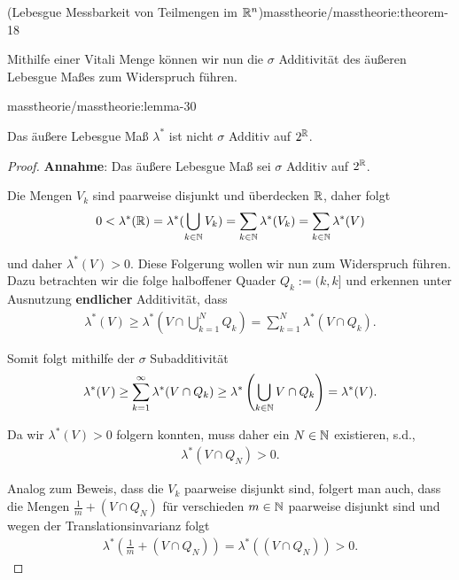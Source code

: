 \begin{theorem}{(Lebesgue Messbarkeit von Teilmengen im \protect\(\mathbb{R}^n\protect\))}{masstheorie/masstheorie:theorem-18}
\par
Mithilfe einer Vitali Menge können wir nun die \(\sigma\) Additivität des äußeren Lebesgue Maßes zum Widerspruch führen.
\begin{lemma}{}{masstheorie/masstheorie:lemma-30}



\par
Das äußere Lebesgue Maß \(\lambda^\ast\) ist nicht \(\sigma\) Additiv auf \(2^{\mathbb{R}}\).
\end{lemma}

\begin{proof}
 \textbf{Annahme}: Das äußere Lebesgue Maß sei \(\sigma\) Additiv auf \(2^{\mathbb{R}}\).

\par
Die Mengen \(V_k\) sind paarweise disjunkt und überdecken \(\mathbb{R}\), daher folgt
\begin{align*}
0<\lambda^\ast(\mathbb{R}) = \lambda^\ast(\bigcup_{k\in\mathbb{N}} V_k) = \sum_{k\in\mathbb{N}} \lambda^\ast(V_k) = \sum_{k\in\mathbb{N}} \lambda^\ast(V)
\end{align*}
\par
und daher \(\lambda^\ast(V)>0\). Diese Folgerung wollen wir nun zum Widerspruch führen. Dazu betrachten wir die folge halboffener Quader \(Q_k:=(k,k]\) und erkennen unter Ausnutzung \textbf{endlicher} Additivität, dass
\begin{align*}
\lambda^\ast(V) \geq \lambda^\ast\left(V \cap \bigcup_{k=1}^N Q_k\right) = 
\sum_{k=1}^N \lambda^\ast(V\cap Q_k).
\end{align*}
\par
Somit folgt mithilfe der \(\sigma\) Subadditivität
\begin{align*}
\lambda^\ast(V) \geq \sum_{k=1}^\infty \lambda^\ast(V\cap Q_k) \geq
\lambda^\ast\left(\bigcup_{k\in\mathbb{N}} V\cap Q_k\right) = \lambda^\ast(V).
\end{align*}
\par
Da wir \(\lambda^\ast(V)>0\) folgern konnten, muss daher ein \(N\in\mathbb{N}\) existieren, s.d.,
\begin{align*}
\lambda^\ast(V\cap Q_N) >0.
\end{align*}
\par
Analog zum Beweis, dass die \(V_k\) paarweise disjunkt sind, folgert man auch, dass die Mengen \(\frac{1}{m}+(V\cap Q_N)\) für verschieden \(m\in\mathbb{N}\) paarweise disjunkt sind und wegen der Translationsinvarianz folgt
\begin{align*}
\lambda^\ast(\frac{1}{m}+(V\cap Q_N)) = \lambda^\ast((V\cap Q_N)) >0.
\end{align*}

\end{proof}
\end{theorem}
